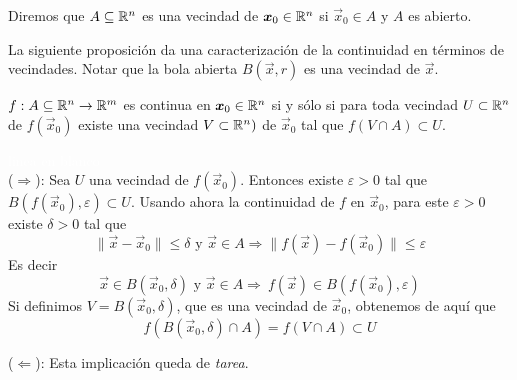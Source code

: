 
\begin{definicion} 
Diremos que $A\subseteq\mathbb{R}^n$ es una vecindad de $\boldsymbol{x}_0\in\mathbb{R}^n$ si $\vec{x}_0\in A$ y $A$ es abierto.
\end{definicion}

La siguiente proposici\'on da una caracterizaci\'on de la continuidad en t\'erminos de vecindades. Notar que la bola abierta $B(\vec{x},r)$ es una vecindad de $\vec{x}$.

\begin{proposicion} $f:A\subseteq\mathbb{R}^n\to\mathbb{R}^m$ es continua en $\boldsymbol{x}_0\in\mathbb{R}^n$ si y s\'olo si para toda vecindad $U\subset \mathbb{R}^n$ de $f(\vec{x}_0)$ existe una vecindad $V\subset\mathbb{R}^n)$ de $\vec{x}_0$ tal que $f(V\cap A)\subset U.$
\end{proposicion}

\begin{demostracion} 
\textcolor{white}{linea en blanco}
\\($\Rightarrow$): Sea $U$ una vecindad de $f(\vec{x}_0)$. Entonces
existe  $\varepsilon>0$ tal que $B(f(\vec{x}_0),\varepsilon)\subset U$. 
Usando ahora la continuidad de $f$ en $\vec{x}_0$,  para este $\varepsilon>0$ 
existe $\delta>0$ tal que
$$\|\vec{x}-\vec{x}_0\|\leq \delta \text{ y }
\vec{x}\in A\Rightarrow\|f(\vec{x})-f(\vec{x}_0)\|\leq \varepsilon
$$
Es decir
$$\vec{x}\in B(\vec{x}_0,\delta) \text{ y } \vec{x}\in A\Rightarrow\: f(\vec{x})\in B(f(\vec{x}_0),\varepsilon)
$$
Si definimos $V=B(\vec{x}_0,\delta)$, que  es una vecindad de $\vec{x}_0$, obtenemos de aqu\'i que 
$$f(B(\vec{x}_0,\delta)\cap A)=f(V\cap A)\subset U$$

\smallskip

($\Leftarrow$): Esta implicaci\'on queda de \emph{tarea}.
 \end{demostracion}


